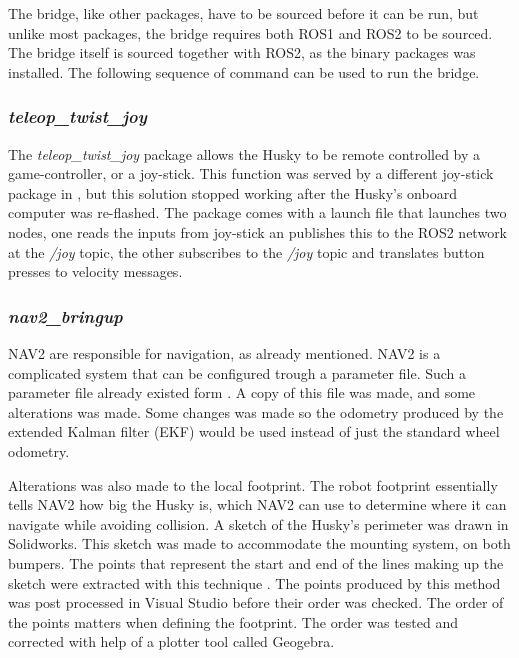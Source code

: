 The bridge, like other packages, have to be sourced before it can be run, but unlike most packages, the bridge requires both ROS1 and ROS2 to be sourced. The bridge itself is sourced together with ROS2, as the binary packages was installed. The following sequence of command can be used to run the bridge.

\begin{tcolorbox}[width=\textwidth,colback={black},colupper=white, title={ubuntu terminal},colbacktitle=gray!125,coltitle=gray!50]\label{shell:echo1}    
\end{tcolorbox} 

\subsubsection{\textit{teleop\_twist\_joy}}
The \textit{teleop\_twist\_joy} package allows the Husky to be remote controlled by a game-controller, or a joy-stick. This function was served by a different joy-stick package in \cite{uia_husky_0776}, but this solution stopped working after the Husky's onboard computer was re-flashed. The package comes with a launch file that launches two nodes, one reads the inputs from joy-stick an publishes this to the ROS2 network at the \textit{/joy} topic, the other subscribes to the \textit{/joy} topic and translates button presses to velocity messages.

\subsubsection{\textit{nav2\_bringup}}\label{subsubsec:nav2_bringup}
NAV2 are responsible for navigation, as already mentioned. NAV2 is a complicated system that can be configured trough a parameter file. Such a parameter file already existed form \cite{uia_husky_0776}. A copy of this file was made, and some alterations was made. Some changes was made so the odometry produced by the extended Kalman filter (EKF) would be used instead of just the standard wheel odometry.

Alterations was also made to the local footprint. The robot footprint essentially tells NAV2 how big the Husky is, which NAV2 can use to determine where it can navigate while avoiding collision. A sketch of the Husky's perimeter was drawn in Solidworks. This sketch was made to accommodate the mounting system, on both bumpers. The points that represent the start and end of the lines making up the sketch were extracted with this technique \cite{extractingXYZPointData}. The points produced by this method was post processed in Visual Studio before their order was checked. The order of the points matters when defining the footprint. The order was tested and corrected with help of a plotter tool called Geogebra.



